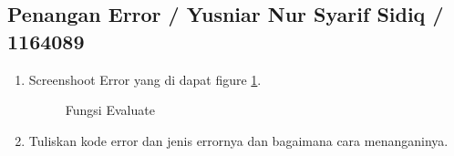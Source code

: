 \subsection{Penangan Error / Yusniar Nur Syarif Sidiq / 1164089}
\begin{enumerate}

\item Screenshoot Error yang di dapat figure \ref{YNC6-18}. 
	
	\begin{figure}[!htbp]
		\caption{Fungsi Evaluate}
		\label{YNC6-18}
	\end{figure} 

\item Tuliskan kode error dan jenis errornya dan bagaimana cara menanganinya.
		


\end{enumerate}
